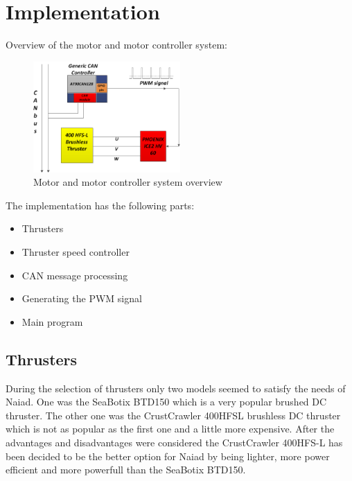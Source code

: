 \section{Implementation}\label{sec:implementation}
Overview of the motor and motor controller system:
\begin{figure}[h]
    \includegraphics[width=0.5\textwidth]{./figure/figA.png}
    \caption{Motor and motor controller system overview}
    \label{fig:one_column_figure}
\end{figure}

The implementation has the following parts:
\begin{itemize}
\item Thrusters
\item Thruster speed controller
 \item CAN message processing
 \item Generating the PWM signal
 \item Main program 
\end{itemize}

\subsection{Thrusters}
During the selection of thrusters only two models seemed to satisfy the needs of Naiad. One was the SeaBotix BTD150 which is a very popular brushed DC thruster. The other one was the CrustCrawler 400HFSL brushless DC thruster which is not as popular as the first one and a little more expensive. After the advantages and disadvantages were considered the CrustCrawler 400HFS-L has been decided to be the better option for Naiad by being lighter, more power efficient and more powerfull than the SeaBotix BTD150. 

